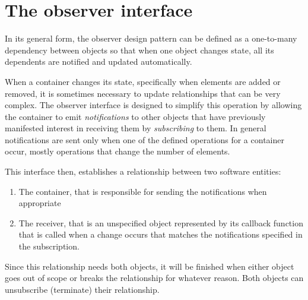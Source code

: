 \documentclass[12pt,a4paper,openany]{memoir} %
\newcommand{\container}{}
\begin{document}

\section{The observer interface}
\renewcommand{\container}{Observer}
In its general form, the observer design pattern can be defined as a one-to-many dependency between objects so that when one object 
changes state, all its dependents are notified and updated automatically. 

When a container changes its state, specifically when elements are added or removed, it is sometimes necessary to update relationships that 
can be very complex.
The observer interface is designed to simplify this operation by allowing the container to emit \textsl{notifications} to other objects that have 
previously manifested interest in receiving them by \textsl{subscribing} to them. In general notifications are sent only when one of the defined
operations for a container occur, mostly operations that change the number of elements.

This interface then, establishes a relationship between two software entities:
\begin{enumerate}
\item The container, that is responsible for sending the notifications when appropriate
\item The receiver, that is an unspecified object represented by its callback function that is called when a change occurs that matches the
notifications specified in the subscription.
\end{enumerate}

Since this relationship needs both objects, it will be finished when either object goes out of scope or breaks the relationship for whatever 
reason. Both objects can unsubscribe (terminate) their relationship.
\end{document}
